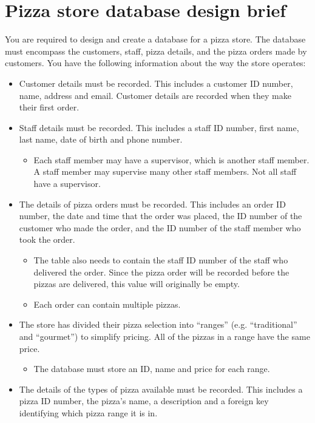 \section{Pizza store database design brief}

You are required to design and create a database for a pizza store. The database must encompass the customers, staff, pizza details, and the pizza orders made by customers. You have the following information about the way the store operates:

\begin{itemize}
\item Customer details must be recorded. This includes a customer ID number, name, address and email. Customer details are recorded when they make their first order.
\item Staff details must be recorded. This includes a staff ID number, first name, last name, date of birth and phone number.
	\begin{itemize}
	\item Each staff member may have a supervisor, which is another staff member. A staff member may supervise many other staff members. Not all staff have a supervisor.
	\end{itemize}
\item The details of pizza orders must be recorded. This includes an order ID number, the date and time that the order was placed, the ID number of the customer who made the order, and the ID number of the staff member who took the order.
	\begin{itemize}
	\item The table also needs to contain the staff ID number of the staff who delivered the order. Since the pizza order will be recorded before the pizzas are delivered, this value will originally be empty.
	\item Each order can contain multiple pizzas.
	\end{itemize}
\item The store has divided their pizza selection into ``ranges'' (e.g. ``traditional'' and ``gourmet'') to simplify pricing. All of the pizzas in a range have the same price.
	\begin{itemize}
	\item The database must store an ID, name and price for each range.
	\end{itemize}
\item The details of the types of pizza available must be recorded. This includes a pizza ID number, the pizza’s name, a description and a foreign key identifying which pizza range it is in.

\end{itemize}
